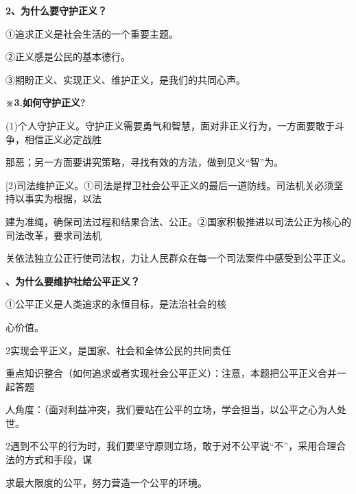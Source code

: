 \documentclass[lang=cn,11pt]{elegantbook}
\newcommand{\daofasym}[1]{{\daofasymbolfont #1}}
\newcommand{\daofasym}[1]{#1}
\begin{document}
\textbf{2、为什么要守护正义？}\par

\daofasym{①}追求正义是社会生活的一个重要主题。\par

\daofasym{②}正义感是公民的基本德行。\par

\daofasym{③}期盼正义、实现正义、维护正义，是我们的共同心声。\par

\textbf{※3.如何守护正义?}\par

(1)个人守护正义。守护正义需要勇气和智慧，面对非正义行为，一方面要敢于斗争，相信正义必定战胜\par

那恶；另一方面要讲究策略，寻找有效的方法，做到见义“智”为。\par

[2)司法维护正义。\daofasym{①}司法是捍卫社会公平正义的最后一道防线。司法机关必须坚持以事实为根据，以法\par

建为准绳，确保司法过程和结果合法、公正。\daofasym{②}国家积极推进以司法公正为核心的司法改革，要求司法机\par

关依法独立公正行使司法权，力让人民群众在每一个司法案件中感受到公平正义。\par

\textbf{、为什么要维护社给公平正义？}\par

\daofasym{①}公平正义是人类追求的永恒目标，是法治社会的核\par

心价值。\par

2实现会平正义，是国家、社会和全体公民的共同责任\par

重点知识整合（如何追求或者实现社会公平正义）：注意，本题把公平正义合并一起答题\par

人角度：（面对利益冲突，我们要站在公平的立场，学会担当，以公平之心为人处世。\par

2遇到不公平的行为时，我们要坚守原则立场，敢于对不公平说“不”，采用合理合法的方式和手段，谋\par

求最大限度的公平，努力营造一个公平的环境。\par
\end{document}
